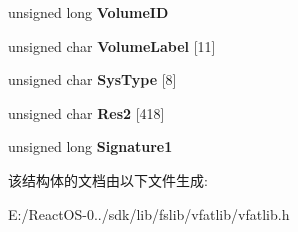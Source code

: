 \begin{DoxyCompactItemize}
unsigned long {\bfseries Volume\+ID}
\item 
\mbox{\label{struct___f_a_t32___b_o_o_t___s_e_c_t_o_r_ab5450d77bd631752825a355717dc7525}} 
unsigned char {\bfseries Volume\+Label} \mbox{[}11\mbox{]}
\item 
\mbox{\label{struct___f_a_t32___b_o_o_t___s_e_c_t_o_r_a737600f7042499f8e302b0e1afdc50af}} 
unsigned char {\bfseries Sys\+Type} \mbox{[}8\mbox{]}
\item 
\mbox{\label{struct___f_a_t32___b_o_o_t___s_e_c_t_o_r_aa1cdd9f5caf192b2150849b00ed0e9e0}} 
unsigned char {\bfseries Res2} \mbox{[}418\mbox{]}
\item 
\mbox{\label{struct___f_a_t32___b_o_o_t___s_e_c_t_o_r_afd05913b64a89e45dfe73ecc3724f22b}} 
unsigned long {\bfseries Signature1}
\end{DoxyCompactItemize}


该结构体的文档由以下文件生成\+:\begin{DoxyCompactItemize}
\item 
E\+:/\+React\+O\+S-\/0../sdk/lib/fslib/vfatlib/vfatlib.\+h\end{DoxyCompactItemize}

